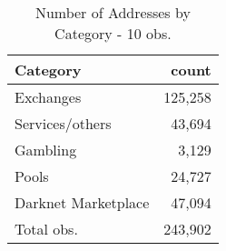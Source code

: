\begin{table}[ht]
\centering
\begin{tabular}{lr}
  \hline
Category & count \\ 
  \hline
Exchanges & 125,258 \\ 
  Services/others & 43,694 \\ 
  Gambling & 3,129 \\ 
  Pools & 24,727 \\ 
  Darknet Marketplace & 47,094 \\ 
  Total obs. & 243,902 \\ 
   \hline
\end{tabular}
\caption{Number of Addresses by Category - 10 obs.} 
\label{n_cat_10obs}
\end{table}
